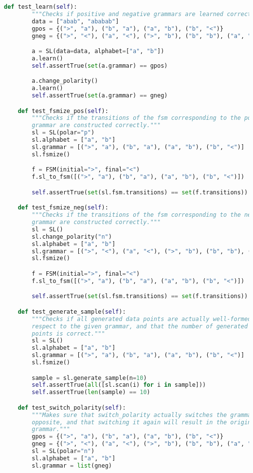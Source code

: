 \begin{lstlisting}[language=Python]
    def test_learn(self):
        """Checks if positive and negative grammars are learned correctly."""
        data = ["abab", "ababab"]
        gpos = {(">", "a"), ("b", "a"), ("a", "b"), ("b", "<")}
        gneg = {(">", "<"), ("a", "<"), (">", "b"), ("b", "b"), ("a", "a")}

        a = SL(data=data, alphabet=["a", "b"])
        a.learn()
        self.assertTrue(set(a.grammar) == gpos)

        a.change_polarity()
        a.learn()
        self.assertTrue(set(a.grammar) == gneg)

    def test_fsmize_pos(self):
        """Checks if the transitions of the fsm corresponding to the positive
        grammar are constructed correctly."""
        sl = SL(polar="p")
        sl.alphabet = ["a", "b"]
        sl.grammar = [(">", "a"), ("b", "a"), ("a", "b"), ("b", "<")]
        sl.fsmize()

        f = FSM(initial=">", final="<")
        f.sl_to_fsm([(">", "a"), ("b", "a"), ("a", "b"), ("b", "<")])

        self.assertTrue(set(sl.fsm.transitions) == set(f.transitions))

    def test_fsmize_neg(self):
        """Checks if the transitions of the fsm corresponding to the negative
        grammar are constructed correctly."""
        sl = SL()
        sl.change_polarity("n")
        sl.alphabet = ["a", "b"]
        sl.grammar = [(">", "<"), ("a", "<"), (">", "b"), ("b", "b"), ("a", "a")]
        sl.fsmize()

        f = FSM(initial=">", final="<")
        f.sl_to_fsm([(">", "a"), ("b", "a"), ("a", "b"), ("b", "<")])

        self.assertTrue(set(sl.fsm.transitions) == set(f.transitions))

    def test_generate_sample(self):
        """Checks if all generated data points are actually well-formed with
        respect to the given grammar, and that the number of generated data
        points is correct."""
        sl = SL()
        sl.alphabet = ["a", "b"]
        sl.grammar = [(">", "a"), ("b", "a"), ("a", "b"), ("b", "<")]
        sl.fsmize()

        sample = sl.generate_sample(n=10)
        self.assertTrue(all([sl.scan(i) for i in sample]))
        self.assertTrue(len(sample) == 10)

    def test_switch_polarity(self):
        """Makes sure that switch_polarity actually switches the grammar to the
        opposite, and that switching it again will result in the original
        grammar."""
        gpos = {(">", "a"), ("b", "a"), ("a", "b"), ("b", "<")}
        gneg = {(">", "<"), ("a", "<"), (">", "b"), ("b", "b"), ("a", "a")}
        sl = SL(polar="n")
        sl.alphabet = ["a", "b"]
        sl.grammar = list(gneg)


\end{lstlisting}
